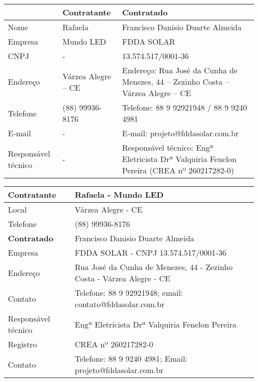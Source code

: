 
\begin{table}[h]
\centering
\begin{tabularx}{\textwidth}{|l|l|X|}
\hline
		&\textbf{Contratante} 	& \textbf{Contratado} \\ \hline
Nome 	& Rafaela 				&  Francisco Danisio Duarte Almeida \\ \hline
Empresa & Mundo LED 			&  FDDA SOLAR \\ \hline
CNPJ 	& - 					&  13.574.517/0001-36 \\ \hline
Endereço& Várzea Alegre – CE 	& Endereço: Rua José da Cunha de Menezes, 44 – Zezinho Costa – Várzea Alegre – CE \\ \hline
Telefone& (88) 99936-8176 		& Telefone: 88 9 92921948 / 88 9 9240 4981 \\ \hline
E-mail	& - 					& E-mail: projeto@fddasolar.com.br \\ \hline
Responsável técnico& - 			& Responsável técnico: Engª Eletricista Drª Valquiria Fenelon Pereira (CREA nº 260217282-0) \\
\hline
\end{tabularx}
\end{table}

\begin{table}[h]
\centering
\begin{tabular}{|l|l|}
\hline
\textbf{Contratante} & Rafaela - Mundo LED \\ \hline
Local & Várzea Alegre - CE \\ \hline
Telefone & (88) 99936-8176 \\ \hline
\textbf{Contratado} & Francisco Danisio Duarte Almeida \\ \hline
Empresa & FDDA SOLAR - CNPJ 13.574.517/0001-36 \\ \hline
Endereço & Rua José da Cunha de Menezes, 44 - Zezinho Costa - Várzea Alegre - CE \\ \hline
Contato & Telefone: 88 9 92921948; email: contato@fddasolar.com.br \\ \hline
Responsável técnico & Engª Eletricista Drª Valquiria Fenelon Pereira \\
Registro & CREA nº 260217282-0 \\ \hline
Contato & Telefone: 88 9 9240 4981; Email: projeto@fddasolar.com.br \\ \hline
\end{tabular}
\end{table}

